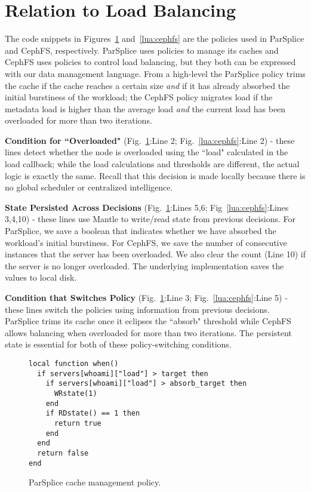 \section{Relation to Load Balancing}
\label{sec:relation-to-load-balancing}

The code snippets in Figures~\ref{lua:parsplice} and~\ref{lua:cephfs} are the
policies used in ParSplice and CephFS, respectively.  ParSplice uses policies
to manage its caches and CephFS uses policies to control load balancing, but
they both can be expressed with our data management language.  From a
high-level the ParSplice policy trims the cache if the cache reaches a certain
size {\it and} if it has already absorbed the initial burstiness of the
workload; the CephFS policy migrates load if the metadata load is higher than
the average load {\it and} the current load has been overloaded for more than
two iterations.

\textbf{Condition for ``Overloaded"} (Fig.~\ref{lua:parsplice}:Line 2;
Fig.~\ref{lua:cephfs}:Line 2) - these lines detect whether the node is
overloaded using the ``load" calculated in the load callback; while the load
calculations and thresholds are different, the actual logic is exactly the
same.  Recall that this decision is made locally because there is no global
scheduler or centralized intelligence. 

\textbf{State Persisted Across Decisions} (Fig.~\ref{lua:parsplice}:Lines 5,6;
Fig~\ref{lua:cephfs}:Lines 3,4,10) - these lines use Mantle to write/read state
from previous decisions.  For ParSplice, we save a boolean that indicates
whether we have absorbed the workload's initial burstiness. For CephFS, we save
the number of consecutive instances that the server has been overloaded. We
also clear the count (Line 10) if the server is no longer overloaded. The
underlying implementation saves the values to local disk.

\textbf{Condition that Switches Policy} (Fig.~\ref{lua:parsplice}:Line 3;
Fig.~\ref{lua:cephfs}:Line 5) - these lines switch the policies using
information from previous decisions. ParSplice trims its cache once it eclipses
the ``absorb" threshold while CephFS allows balancing when overloaded for more
than two iterations. The persistent state is essential for both of these
policy-switching conditions.

\begin{figure}[t]
\footnotesize
\begin{verbatim}
local function when()
  if servers[whoami]["load"] > target then
    if servers[whoami]["load"] > absorb_target then
      WRstate(1)
    end
    if RDstate() == 1 then
      return true
    end
  end
  return false
end
\end{verbatim}
\caption{ParSplice cache management policy.\label{lua:parsplice}}
\end{figure}

